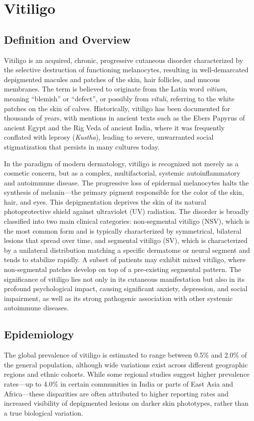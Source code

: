 \chapter{Vitiligo}

\section*{Definition and Overview}
Vitiligo is an acquired, chronic, progressive cutaneous disorder characterized by the selective destruction of functioning melanocytes, resulting in well-demarcated depigmented macules and patches of the skin, hair follicles, and mucous membranes. The term is believed to originate from the Latin word \textit{vitium}, meaning ``blemish'' or ``defect'', or possibly from \textit{vituli}, referring to the white patches on the skin of calves. Historically, vitiligo has been documented for thousands of years, with mentions in ancient texts such as the Ebers Papyrus of ancient Egypt and the Rig Veda of ancient India, where it was frequently conflated with leprosy (\textit{Kustha}), leading to severe, unwarranted social stigmatization that persists in many cultures today.

In the paradigm of modern dermatology, vitiligo is recognized not merely as a cosmetic concern, but as a complex, multifactorial, systemic autoinflammatory and autoimmune disease. The progressive loss of epidermal melanocytes halts the synthesis of melanin—the primary pigment responsible for the color of the skin, hair, and eyes. This depigmentation deprives the skin of its natural photoprotective shield against ultraviolet (UV) radiation. The disorder is broadly classified into two main clinical categories: non-segmental vitiligo (NSV), which is the most common form and is typically characterized by symmetrical, bilateral lesions that spread over time, and segmental vitiligo (SV), which is characterized by a unilateral distribution matching a specific dermatome or neural segment and tends to stabilize rapidly. A subset of patients may exhibit mixed vitiligo, where non-segmental patches develop on top of a pre-existing segmental pattern. The significance of vitiligo lies not only in its cutaneous manifestation but also in its profound psychological impact, causing significant anxiety, depression, and social impairment, as well as its strong pathogenic association with other systemic autoimmune diseases.

\section*{Epidemiology}
The global prevalence of vitiligo is estimated to range between 0.5\% and 2.0\% of the general population, although wide variations exist across different geographic regions and ethnic cohorts. While some regional studies suggest higher prevalence rates—up to 4.0\% in certain communities in India or parts of East Asia and Africa—these disparities are often attributed to higher reporting rates and increased visibility of depigmented lesions on darker skin phototypes, rather than a true biological variation.

